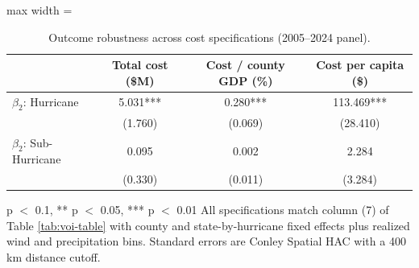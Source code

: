 \begin{table}

\caption{Outcome robustness across cost specifications (2005--2024 panel). \label{tab:appA_outcomes}}
\centering
\begin{adjustbox}{max width = \textwidth}
\begin{threeparttable}
\begin{tabular}[t]{lccc}
\toprule
  & Total cost (\$M) & Cost / county GDP (\%) & Cost per capita (\$)\\
\midrule
$\beta_2$: Hurricane & \num{5.031}*** & \num{0.280}*** & \num{113.469}***\\
 & (\num{1.760}) & (\num{0.069}) & (\num{28.410})\\
$\beta_2$: Sub-Hurricane & \num{0.095} & \num{0.002} & \num{2.284}\\
 & (\num{0.330}) & (\num{0.011}) & (\num{3.284})\\
\bottomrule
\end{tabular}
\begin{tablenotes}
\item * p $<$ 0.1, ** p $<$ 0.05, *** p $<$ 0.01 All specifications match column (7) of Table \ref{tab:voi-table} with county and state-by-hurricane fixed effects plus realized wind and precipitation bins. Standard errors are Conley Spatial HAC with a 400 km distance cutoff.
\end{tablenotes}
\end{threeparttable}
\end{adjustbox}
\end{table}
